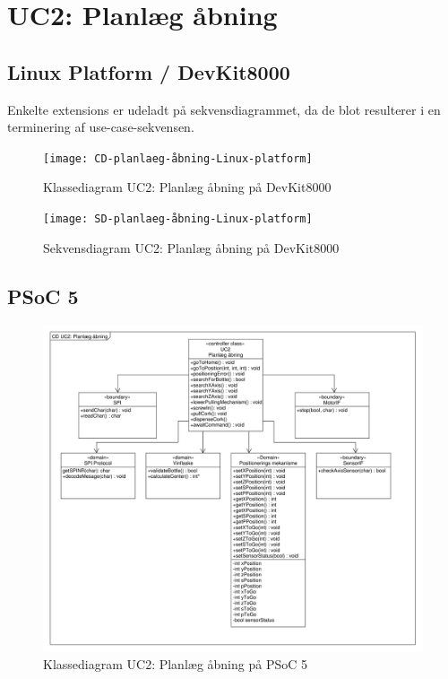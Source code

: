\section{UC2: Planlæg åbning}

\subsection{Linux Platform / DevKit8000}

Enkelte extensions er udeladt på sekvensdiagrammet, da de blot resulterer i en terminering af use-case-sekvensen.

\begin{figure}[H]
	\caption{Klassediagram UC2: Planlæg åbning på DevKit8000}
	\label{CD:UC2-devkit}
	\texttt{[image: CD-planlaeg-åbning-Linux-platform]}
\end{figure}

\begin{figure}[H]
	\caption{Sekvensdiagram UC2: Planlæg åbning på DevKit8000}
	\label{SD:UC2-devkit}
	\texttt{[image: SD-planlaeg-åbning-Linux-platform]}
\end{figure}

\subsection{PSoC 5}
\begin{figure}[H]
	\caption{Klassediagram UC2: Planlæg åbning på PSoC 5}
	\label{CD:PSoC:UC2-1}
	\includegraphics[scale=0.35,trim=0 0 0 0, clip]{APPSoC/UC2-CD-planlaeg-aabning-PSoC}
\end{figure}


